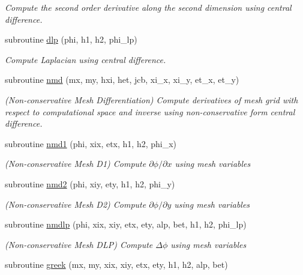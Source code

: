 \begin{DoxyCompactItemize}
\begin{DoxyCompactList}\small\item\em Compute the second order derivative along the second dimension using central difference. \end{DoxyCompactList}\item 
subroutine \hyperlink{namespacemirana_a353bce8a93046cd8fd25021634d6503e}{dlp} (phi, h1, h2, phi\+\_\+lp)
\begin{DoxyCompactList}\small\item\em Compute Laplacian using central difference. \end{DoxyCompactList}\item 
subroutine \hyperlink{namespacemirana_a53c223d4530275ef3fc6a5820f5b0990}{nmd} (mx, my, hxi, het, jcb, xi\+\_\+x, xi\+\_\+y, et\+\_\+x, et\+\_\+y)
\begin{DoxyCompactList}\small\item\em (Non-\/conservative Mesh Differentiation) Compute derivatives of mesh grid with respect to computational space and inverse using non-\/conservative form central difference. \end{DoxyCompactList}\item 
subroutine \hyperlink{namespacemirana_a6b48fffbaaa6f2256928cd73d8891261}{nmd1} (phi, xix, etx, h1, h2, phi\+\_\+x)
\begin{DoxyCompactList}\small\item\em (Non-\/conservative Mesh D1) Compute $\partial\phi/\partial x$ using mesh variables \end{DoxyCompactList}\item 
subroutine \hyperlink{namespacemirana_a04bd9101c8bdc2f8b69892bd773f3055}{nmd2} (phi, xiy, ety, h1, h2, phi\+\_\+y)
\begin{DoxyCompactList}\small\item\em (Non-\/conservative Mesh D2) Compute $\partial\phi/\partial y$ using mesh variables \end{DoxyCompactList}\item 
subroutine \hyperlink{namespacemirana_a503a76ad6fbdf28508f8d71786bed518}{nmdlp} (phi, xix, xiy, etx, ety, alp, bet, h1, h2, phi\+\_\+lp)
\begin{DoxyCompactList}\small\item\em (Non-\/conservative Mesh D\+L\+P) Compute $\Delta\phi$ using mesh variables \end{DoxyCompactList}\item 
subroutine \hyperlink{namespacemirana_a7530ea2e7b2dfe85f3a088d24de59f1d}{greek} (mx, my, xix, xiy, etx, ety, h1, h2, alp, bet)

\end{DoxyCompactItemize}
